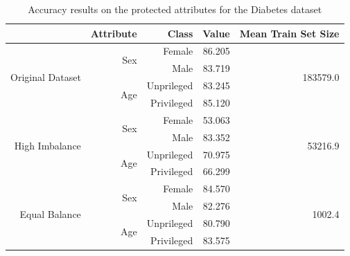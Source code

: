 \documentclass[12pt]{article}
\begin{document}
\begin{table}[]
  \centering
  \begin{tabular}{@{}rrrrr@{}}
  \toprule
                                    & Attribute            & Class      & Value  & Mean Train Set Size       \\ \midrule
  \multirow{4}{*}{Original Dataset} & \multirow{2}{*}{Sex} & Female     & 86.205 & \multirow{4}{*}{183579.0} \\
                                    &                      & Male       & 83.719 &                           \\
                                    & \multirow{2}{*}{Age} & Unprileged & 83.245 &                           \\
                                    &                      & Privileged & 85.120 &                           \\ \midrule
  \multirow{4}{*}{High Imbalance}   & \multirow{2}{*}{Sex} & Female     & 53.063 & \multirow{4}{*}{53216.9}  \\
                                    &                      & Male       & 83.352 &                           \\
                                    & \multirow{2}{*}{Age} & Unprileged & 70.975 &                           \\
                                    &                      & Privileged & 66.299 &                           \\ \midrule
  \multirow{4}{*}{Equal Balance}    & \multirow{2}{*}{Sex} & Female     & 84.570 & \multirow{4}{*}{1002.4}   \\
                                    &                      & Male       & 82.276 &                           \\
                                    & \multirow{2}{*}{Age} & Unprileged & 80.790 &                           \\
                                    &                      & Privileged & 83.575 &                           \\ \bottomrule
  \end{tabular}
  \caption{Accuracy results on the protected attributes for the Diabetes dataset}
  \label{tab:acc-diabetes}
  \end{table}
\end{document}
